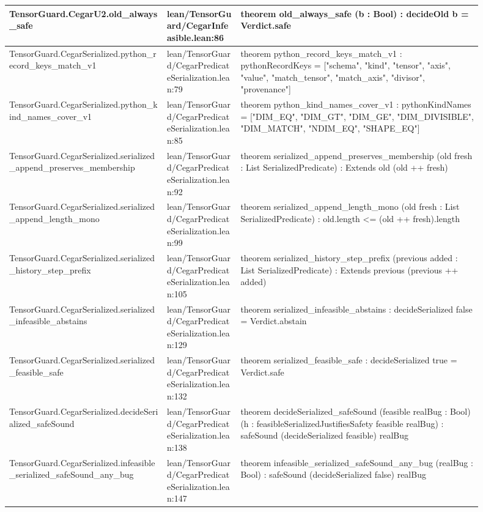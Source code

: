 \documentclass[10pt]{article}
\begin{document}
\begin{longtable}{|p{0.30\linewidth}|p{0.14\linewidth}|p{0.46\linewidth}|}
\hline
TensorGuard.CegarU2.old\_always\_safe & lean/TensorGuard/CegarInfeasible.lean:86 & theorem old\_always\_safe (b : Bool) : decideOld b = Verdict.safe \\
\hline
TensorGuard.CegarSerialized.python\_record\_keys\_match\_v1 & lean/TensorGuard/CegarPredicateSerialization.lean:79 & theorem python\_record\_keys\_match\_v1 : pythonRecordKeys = ["schema", "kind", "tensor", "axis", "value", "match\_tensor", "match\_axis", "divisor", "provenance"] \\
\hline
TensorGuard.CegarSerialized.python\_kind\_names\_cover\_v1 & lean/TensorGuard/CegarPredicateSerialization.lean:85 & theorem python\_kind\_names\_cover\_v1 : pythonKindNames = ["DIM\_EQ", "DIM\_GT", "DIM\_GE", "DIM\_DIVISIBLE", "DIM\_MATCH", "NDIM\_EQ", "SHAPE\_EQ"] \\
\hline
TensorGuard.CegarSerialized.serialized\_append\_preserves\_membership & lean/TensorGuard/CegarPredicateSerialization.lean:92 & theorem serialized\_append\_preserves\_membership (old fresh : List SerializedPredicate) : Extends old (old ++ fresh) \\
\hline
TensorGuard.CegarSerialized.serialized\_append\_length\_mono & lean/TensorGuard/CegarPredicateSerialization.lean:99 & theorem serialized\_append\_length\_mono (old fresh : List SerializedPredicate) : old.length <= (old ++ fresh).length \\
\hline
TensorGuard.CegarSerialized.serialized\_history\_step\_prefix & lean/TensorGuard/CegarPredicateSerialization.lean:105 & theorem serialized\_history\_step\_prefix (previous added : List SerializedPredicate) : Extends previous (previous ++ added) \\
\hline
TensorGuard.CegarSerialized.serialized\_infeasible\_abstains & lean/TensorGuard/CegarPredicateSerialization.lean:129 & theorem serialized\_infeasible\_abstains : decideSerialized false = Verdict.abstain \\
\hline
TensorGuard.CegarSerialized.serialized\_feasible\_safe & lean/TensorGuard/CegarPredicateSerialization.lean:132 & theorem serialized\_feasible\_safe : decideSerialized true = Verdict.safe \\
\hline
TensorGuard.CegarSerialized.decideSerialized\_safeSound & lean/TensorGuard/CegarPredicateSerialization.lean:138 & theorem decideSerialized\_safeSound (feasible realBug : Bool) (h : feasibleSerializedJustifiesSafety feasible realBug) : safeSound (decideSerialized feasible) realBug \\
\hline
TensorGuard.CegarSerialized.infeasible\_serialized\_safeSound\_any\_bug & lean/TensorGuard/CegarPredicateSerialization.lean:147 & theorem infeasible\_serialized\_safeSound\_any\_bug (realBug : Bool) : safeSound (decideSerialized false) realBug \\

\end{longtable}
\end{document}
